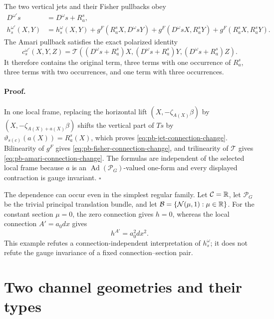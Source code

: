 The two vertical jets and their Fisher pullbacks obey
\begin{align}
D^{\omega'}s
&=D^\omega s+R_a^s,
\label{eq:pb-jet-connection-change}\\
h_s^{\omega'}(X,Y)
&=h_s^\omega(X,Y)
+g^F(R_a^sX,D^\omega sY)
+g^F(D^\omega sX,R_a^sY)
+g^F(R_a^sX,R_a^sY).
\label{eq:pb-fisher-connection-change}
\end{align}
The Amari pullback satisfies the exact polarized identity
\begin{equation}
c_s^{\omega'}(X,Y,Z)
=\mathcal T((D^\omega s+R_a^s)X,
(D^\omega s+R_a^s)Y,
(D^\omega s+R_a^s)Z).
\label{eq:pb-amari-connection-change}
\end{equation}
It therefore contains the original term, three terms with one occurrence of
$R_a^s$, three terms with two occurrences, and one term with three
occurrences.  

\paragraph{Proof.}
In one local frame, replacing the horizontal lift
$(X,-\zeta_{A(X)}\beta)$ by $(X,-\zeta_{A(X)+a(X)}\beta)$ shifts the vertical
part of $Ts$ by $\vartheta_{s(c)}(a(X))=R_a^s(X)$, which proves
\eqref{eq:pb-jet-connection-change}.  Bilinearity of $g^F$ gives
\eqref{eq:pb-fisher-connection-change}, and trilinearity of
$\mathcal T$ gives \eqref{eq:pb-amari-connection-change}.  The formulas are
independent of the selected local frame because $a$ is an
$\operatorname{Ad}(\mathscr P_G)$-valued one-form and every displayed contraction is
gauge invariant.  $\square$

The dependence can occur even in the simplest regular family.  Let
$\mathcal C=\mathbb R$, let $\mathscr P_G$ be the trivial principal translation bundle, and let
$\mathcal B=\{\mathcal N(\mu,1):\mu\in\mathbb R\}$.  For the constant section
$\mu=0$, the zero connection gives $h=0$, whereas the local connection
$A'=a_0dx$ gives
\begin{equation}
h^{A'}=a_0^2dx^2.
\label{eq:pb-connection-dependence-example}
\end{equation}
This example refutes a connection-independent interpretation of
$h_s^\omega$; it does not refute the gauge invariance of a fixed
connection--section pair.  

\section{Two channel geometries and their types}
\label{sec:pb-two-channels}

